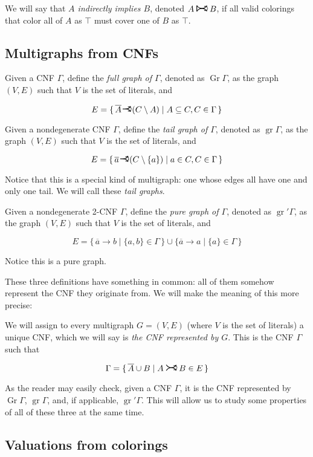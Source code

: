 \documentclass[11pt]{article}
\newcommand{\conj}[1]{\overline{#1}}
\DeclareMathOperator{\gr}{gr}
\DeclareMathOperator{\Gr}{Gr}
\newcommand{\rightcurvearrow}{
\mathrel{
  \begin{tikzpicture}[scale=0.8]
    \draw[thick,->] (0,1ex) arc (30:150:-2ex);
    \draw[thick,->] (0,-1ex) arc (150:30:2ex);
  \end{tikzpicture}
}
}
\newcommand{\rightcurveor}{
\!
\mathrel{
  \begin{tikzpicture}[scale=0.8]
    \draw[thick,->] (0,0) arc (90:150:-2ex);
    \draw[thick,->] (0,0) arc (90:30:2ex);
    \draw[thick] (-1ex, 0) -- (0.1ex,0);
  \end{tikzpicture}
}\!
}
\newcommand{\Rightcurvearrow}{
\mathrel{
  \begin{tikzpicture}[scale=0.8]
    \draw[thick,->] (0,1ex) arc (30:150:-2ex);
    \draw[thick,->] (0,-1ex) arc (150:30:2ex);
    \draw[thick] (0, 1ex) -- (0, -1ex);
  \end{tikzpicture}
}
}
\begin{document}
We will say that \emph{$A$ indirectly implies $B$}, denoted $A \Rightcurvearrow B$, if all valid colorings that color all of $A$ as $\top$ must cover one of $B$ as $\top$.

\subsection{Multigraphs from CNFs}

Given a CNF $\Gamma$, define the \emph{full graph of $\Gamma$}, denoted as $\Gr \Gamma$, as the graph $(V,E)$ such that $V$ is the set of literals, and

\[ E = \{ \, \conj A \rightcurveor (C \setminus A) \mid A \subseteq C, C \in \Gamma \, \}\]

Given a nondegenerate CNF $\Gamma$, define the \emph{tail graph of $\Gamma$}, denoted as $\gr \Gamma$, as the graph $(V,E)$ such that $V$ is the set of literals, and

\[ E = \{ \, \conj a \rightcurveor (C \setminus \{a\}) \mid a \in C, C \in \Gamma \, \}\]

Notice that this is a special kind of multigraph: one whose edges all have one and only one tail. We will call these \emph{tail graphs}.

Given a nondegenerate 2-CNF $\Gamma$, define the \emph{pure graph of $\Gamma$}, denoted as $\gr'\Gamma$, as the graph $(V,E)$ such that $V$ is the set of literals, and

\[ E = \{ \, \conj a \rightarrow b \mid \{a,b\} \in \Gamma \, \} \cup \{ \conj a \rightarrow a \mid \{a\} \in \Gamma \,\}\]

Notice this is a pure graph.

These three definitions have something in common: all of them somehow represent the CNF they originate from. We will make the meaning of this more precise:

We will assign to every multigraph $G = (V,E)$ (where $V$ is the set of literals) a unique CNF, which we will say is \emph{the CNF represented by $G$}. This is the CNF $\Gamma$ such that

\[\Gamma = \{\, \conj A \cup B \mid A \rightcurvearrow B \in E\,\}\]

As the reader may easily check, given a CNF $\Gamma$, it is the CNF represented by $\Gr \Gamma$, $\gr \Gamma$, and, if applicable, $\gr'\Gamma$. This will allow us to study some properties of all of these three at the same time.

\subsection{Valuations from colorings}
\end{document}
